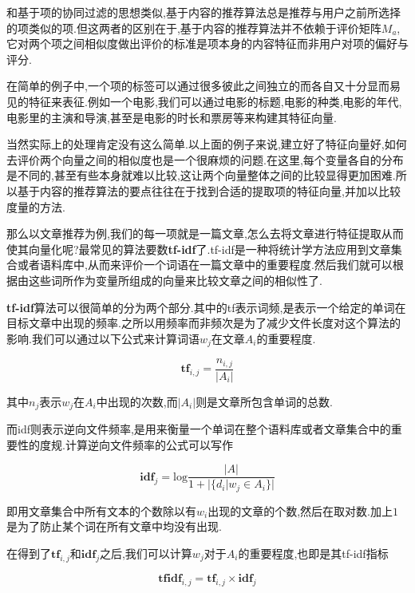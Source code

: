 和基于项的协同过滤的思想类似,基于内容的推荐算法总是推荐与用户之前所选择的项类似的项.但这两者的区别在于,基于内容的推荐算法并不依赖于评价矩阵$M_a$,它对两个项之间相似度做出评价的标准是项本身的内容特征而非用户对项的偏好与评分.

在简单的例子中,一个项的标签可以通过很多彼此之间独立的而各自又十分显而易见的特征来表征.例如一个电影,我们可以通过电影的标题,电影的种类,电影的年代,电影里的主演和导演,甚至是电影的时长和票房等来构建其特征向量.

当然实际上的处理肯定没有这么简单.以上面的例子来说,建立好了特征向量好,如何去评价两个向量之间的相似度也是一个很麻烦的问题.在这里,每个变量各自的分布是不同的,甚至有些本身就难以比较,这让两个向量整体之间的比较显得更加困难.所以基于内容的推荐算法的要点往往在于找到合适的提取项的特征向量,并加以比较度量的方法.

那么以文章推荐为例,我们的每一项就是一篇文章,怎么去将文章进行特征提取从而使其向量化呢?最常见的算法要数\textbf{tf-idf}了.tf-idf是一种将统计学方法应用到文章集合或者语料库中,从而来评价一个词语在一篇文章中的重要程度.然后我们就可以根据由这些词所作为变量所组成的向量来比较文章之间的相似性了.

\textbf{tf-idf}算法可以很简单的分为两个部分.其中的tf表示词频,是表示一个给定的单词在目标文章中出现的频率.之所以用频率而非频次是为了减少文件长度对这个算法的影响.我们可以通过以下公式来计算词语$w_j$在文章$A_i$的重要程度.

\begin{equation}
	\textbf{tf}_{i,j} = \dfrac{n_{i,j}}{|A_i|}
\end{equation}

其中$n_j$表示$w_j$在$A_i$中出现的次数,而$|A_i|$则是文章所包含单词的总数.

而idf则表示逆向文件频率,是用来衡量一个单词在整个语料库或者文章集合中的重要性的度规.计算逆向文件频率的公式可以写作

\begin{equation}
	\textbf{idf}_j = \mbox{log}\dfrac{|A|}{1+|\{d_i|w_j \in A_i\}|}
\end{equation}

即用文章集合中所有文本的个数除以有$w_i$出现的文章的个数,然后在取对数.加上$1$是为了防止某个词在所有文章中均没有出现.

在得到了$\textbf{tf}_{i,j}$和$\textbf{idf}_j$之后,我们可以计算$w_j$对于$A_i$的重要程度,也即是其tf-idf指标

\begin{equation}
	\textbf{tfidf}_{i,j} = \textbf{tf}_{i,j} \times \textbf{idf}_j
\end{equation}

